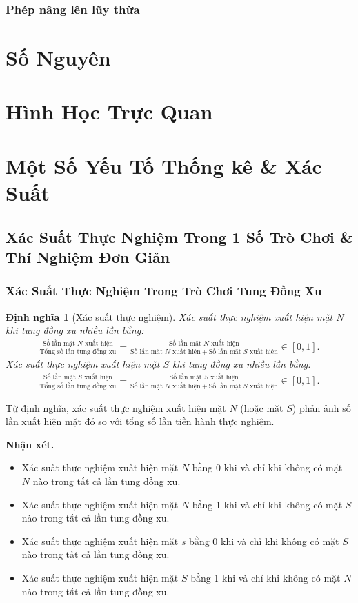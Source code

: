 \documentclass{article}
\numberwithin{equation}{section}
\newtheorem{definition}{Định nghĩa}[section]
\begin{document}
\subsubsection{Phép nâng lên lũy thừa}

\section{Số Nguyên}

\section{Hình Học Trực Quan}

\section{Một Số Yếu Tố Thống kê \& Xác Suất}

\subsection{Xác Suất Thực Nghiệm Trong 1 Số Trò Chơi \& Thí Nghiệm Đơn Giản}

\subsubsection{Xác Suất Thực Nghiệm Trong Trò Chơi Tung Đồng Xu}
\begin{definition}[Xác suất thực nghiệm]
	\emph{Xác suất thực nghiệm xuất hiện mặt $N$} khi tung đồng xu nhiều lần bằng:
	\begin{align*}
		\frac{\mbox{Số lần mặt $N$ xuất hiện}}{\mbox{Tổng số lần tung đồng xu}} = \frac{\mbox{Số lần mặt $N$ xuất hiện}}{\mbox{Số lần mặt $N$ xuất hiện} + \mbox{Số lần mặt $S$ xuất hiện}}\in[0,1].
	\end{align*}
	\emph{Xác suất thực nghiệm xuất hiện mặt $S$} khi tung đồng xu nhiều lần bằng:
	\begin{align*}
		\frac{\mbox{Số lần mặt $S$ xuất hiện}}{\mbox{Tổng số lần tung đồng xu}} = \frac{\mbox{Số lần mặt $S$ xuất hiện}}{\mbox{Số lần mặt $N$ xuất hiện} + \mbox{Số lần mặt $S$ xuất hiện}}\in[0,1].
	\end{align*}
\end{definition}
Từ định nghĩa, xác suất thực nghiệm xuất hiện mặt $N$ (hoặc mặt $S$) phản ảnh số lần xuất hiện mặt đó so với tổng số lần tiền hành thực nghiệm.

\textbf{Nhận xét.}
\begin{itemize}
	\item Xác suất thực nghiệm xuất hiện mặt $N$ bằng 0 khi và chỉ khi không có mặt $N$ nào trong tất cả lần tung đồng xu.
	\item Xác suất thực nghiệm xuất hiện mặt $N$ bằng 1 khi và chỉ khi không có mặt $S$ nào trong tất cả lần tung đồng xu.
	\item Xác suất thực nghiệm xuất hiện mặt $s$ bằng 0 khi và chỉ khi không có mặt $S$ nào trong tất cả lần tung đồng xu.
	\item Xác suất thực nghiệm xuất hiện mặt $S$ bằng 1 khi và chỉ khi không có mặt $N$ nào trong tất cả lần tung đồng xu.
\end{itemize}
\end{document}

